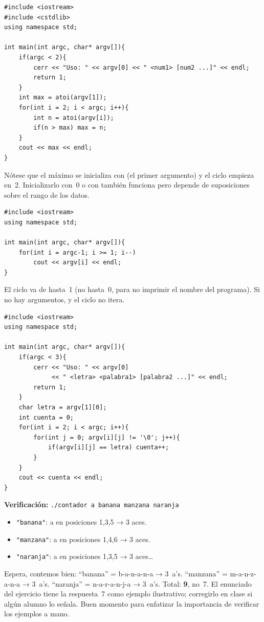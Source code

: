 \documentclass[12pt, oneside]{article}
\begin{document}
\begin{notaprofesor}
\begin{verbatim}
#include <iostream>
#include <cstdlib>
using namespace std;

int main(int argc, char* argv[]){
    if(argc < 2){
        cerr << "Uso: " << argv[0] << " <num1> [num2 ...]" << endl;
        return 1;
    }
    int max = atoi(argv[1]);
    for(int i = 2; i < argc; i++){
        int n = atoi(argv[i]);
        if(n > max) max = n;
    }
    cout << max << endl;
}
\end{verbatim}
  Nótese que el máximo se inicializa con  (el primer
  argumento) y el ciclo empieza en~2.  Inicializarlo con~0 o con
   también funciona pero depende de suposiciones sobre
  el rango de los datos.
\end{notaprofesor}

\begin{notaprofesor}
\begin{verbatim}
#include <iostream>
using namespace std;

int main(int argc, char* argv[]){
    for(int i = argc-1; i >= 1; i--)
        cout << argv[i] << endl;
}
\end{verbatim}
  El ciclo va de  hasta~1 (no hasta~0, para no imprimir
  el nombre del programa).  Si no hay argumentos, 
  y el ciclo no itera.
\end{notaprofesor}

\begin{notaprofesor}
\begin{verbatim}
#include <iostream>
using namespace std;

int main(int argc, char* argv[]){
    if(argc < 3){
        cerr << "Uso: " << argv[0]
             << " <letra> <palabra1> [palabra2 ...]" << endl;
        return 1;
    }
    char letra = argv[1][0];
    int cuenta = 0;
    for(int i = 2; i < argc; i++){
        for(int j = 0; argv[i][j] != '\0'; j++){
            if(argv[i][j] == letra) cuenta++;
        }
    }
    cout << cuenta << endl;
}
\end{verbatim}
  \textbf{Verificación:} \texttt{./contador a banana manzana naranja}
  \begin{itemize}
    \item \texttt{"banana"}: a en posiciones 1,3,5 → 3 aces.
    \item \texttt{"manzana"}: a en posiciones 1,4,6 → 3 aces.
    \item \texttt{"naranja"}: a en posiciones 1,3,5 → 3 aces\dots
  \end{itemize}

  Espera, contemos bien: ``banana'' = b-a-n-a-n-a → 3~a's.
  ``manzana'' = m-a-n-z-a-n-a → 3~a's.  ``naranja'' = n-a-r-a-n-j-a → 3~a's.
  Total: \textbf{9}, no~7.  El enunciado del ejercicio tiene la
  respuesta~7 como ejemplo ilustrativo; corregirlo en clase si algún
  alumno lo señala.  Buen momento para enfatizar la importancia de
  verificar los ejemplos a mano.
\end{notaprofesor}
\end{document}
